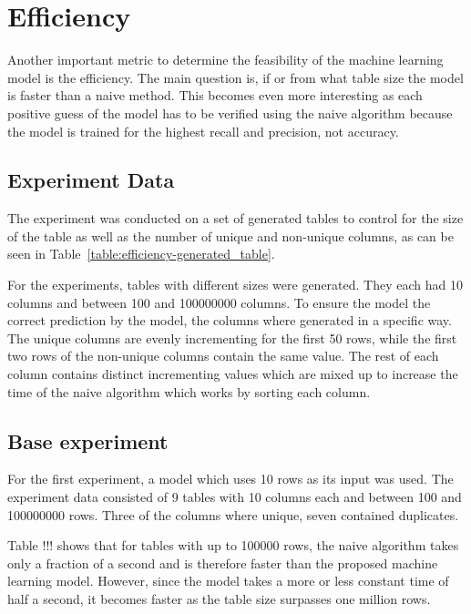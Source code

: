 \section{Efficiency}\label{sec:efficiency}
Another important metric to determine the feasibility of the machine learning model is the efficiency. The main question is, if or from what table size the model is faster than a naive method. This becomes even more interesting as each positive guess of the model has to be verified using the naive algorithm because the model is trained for the highest recall and precision, not accuracy. %


\subsection{Experiment Data}\label{subsec:efficiency-experiment_data}
The experiment was conducted on a set of generated tables to control for the size of the table as well as the number of unique and non-unique columns, as can be seen in Table~\ref{table:efficiency-generated_table}.

For the experiments, tables with different sizes were generated. They each had \num{10} columns and between \num{100} and \num{100000000} columns. To ensure the model the correct prediction by the model, the columns where generated in a specific way. The unique columns are evenly incrementing for the first \num{50} rows, while the first two rows of the non-unique columns contain the same value. The rest of each column contains distinct incrementing values which are mixed up to increase the time of the naive algorithm which works by sorting each column.




\subsection{Base experiment}\label{subsec:efficiency-base_experiment} %
For the first experiment, a model which uses 10 rows as its input was used. The experiment data consisted of \num{9} tables with \num{10} columns each and between \num{100} and \num{100000000} rows. Three of the columns where unique, seven contained duplicates.

Table !!! shows that for tables with up to \num{100000} rows, the naive algorithm takes only a fraction of a second and is therefore faster than the proposed machine learning model. However, since the model takes a more or less constant time of half a second, it becomes faster as the table size surpasses one million rows.

